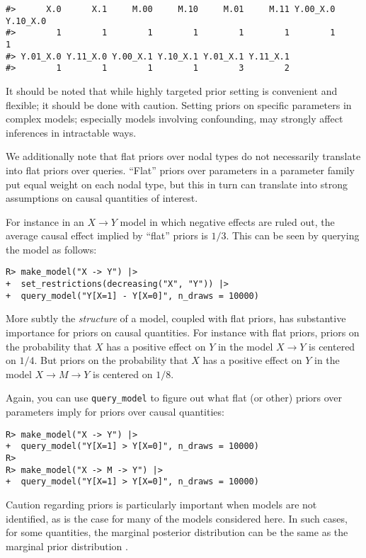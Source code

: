 \documentclass[
  11pt,
  article]{jss}
\begin{document}
\begin{verbatim}
#>      X.0      X.1     M.00     M.10     M.01     M.11 Y.00_X.0 Y.10_X.0 
#>        1        1        1        1        1        1        1        1 
#> Y.01_X.0 Y.11_X.0 Y.00_X.1 Y.10_X.1 Y.01_X.1 Y.11_X.1 
#>        1        1        1        1        3        2
\end{verbatim}

It should be noted that while highly targeted prior setting is
convenient and flexible; it should be done with caution. Setting priors
on specific parameters in complex models; especially models involving
confounding, may strongly affect inferences in intractable ways.

We additionally note that flat priors over nodal types do not
necessarily translate into flat priors over queries. ``Flat'' priors
over parameters in a parameter family put equal weight on each nodal
type, but this in turn can translate into strong assumptions on causal
quantities of interest.

For instance in an \(X \rightarrow Y\) model in which negative effects
are ruled out, the average causal effect implied by ``flat'' priors is
\(1/3\). This can be seen by querying the model as follows:

\begin{verbatim}
R> make_model("X -> Y") |>
+  set_restrictions(decreasing("X", "Y")) |>
+  query_model("Y[X=1] - Y[X=0]", n_draws = 10000)
\end{verbatim}

More subtly the \emph{structure} of a model, coupled with flat priors,
has substantive importance for priors on causal quantities. For instance
with flat priors, priors on the probability that \(X\) has a positive
effect on \(Y\) in the model \(X \rightarrow Y\) is centered on \(1/4\).
But priors on the probability that \(X\) has a positive effect on \(Y\)
in the model \(X \rightarrow M \rightarrow Y\) is centered on \(1/8\).

Again, you can use \texttt{query\_model} to figure out what flat (or
other) priors over parameters imply for priors over causal quantities:

\begin{verbatim}
R> make_model("X -> Y") |>
+  query_model("Y[X=1] > Y[X=0]", n_draws = 10000)
R> 
R> make_model("X -> M -> Y") |>
+  query_model("Y[X=1] > Y[X=0]", n_draws = 10000)
\end{verbatim}

Caution regarding priors is particularly important when models are not
identified, as is the case for many of the models considered here. In
such cases, for some quantities, the marginal posterior distribution can
be the same as the marginal prior distribution
\citep{poirier1998revising}.
\end{document}
